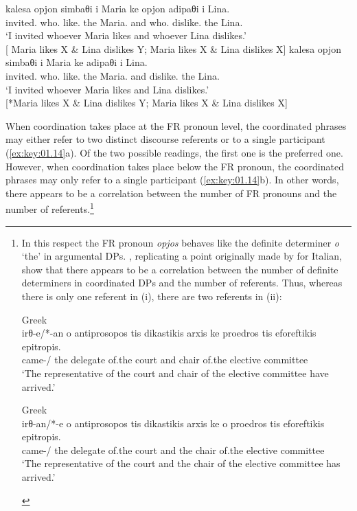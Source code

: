 \documentclass[output=paper]{langsci/langscibook}
\begin{document}
\ea {}\label{ex:key:01.14}
	\ea
		\gll kalesa opjon simbaθi i Maria ke opjon adipaθi i Lina.\\
			 invited.\Fsg{} who.\Acc{} like.\Tsg{} the Maria.\Nom{} and who.\Acc{} dislike.\Tsg{} the Lina.\Nom{}\\
		\glt \enquote*{I invited whoever Maria likes and whoever Lina dislikes.}\\
            {}[ Maria likes X \& Lina dislikes Y;  Maria likes X \& Lina dislikes X]
	\ex
		\gll kalesa opjon simbaθi i Maria ke adipaθi i Lina.\\
			 invited.\Fsg{} who.\Acc{} like.\Tsg{} the Maria.\Nom{} and dislike.\Tsg{} the Lina.\Nom{}\\
		\glt \enquote*{I invited whoever Maria likes and Lina dislikes.}\\
        {}[*Maria likes X \& Lina dislikes Y;  Maria likes X \& Lina dislikes X]
	\z
\z

When coordination takes place at the \gls{FR} pronoun level, the coordinated
phrases may either refer to two distinct discourse referents or to a single
participant (\ref{ex:key:01.14}a). Of the two possible readings, the first one
is the preferred one. However, when coordination takes place below the \gls{FR}
pronoun, the coordinated phrases may only refer to a single participant
(\ref{ex:key:01.14}b). In other words, there appears to be a correlation
between the number of \gls{FR} pronouns and the number of
referents.\footnote{In this respect the \gls{FR} pronoun \emph{opjos} behaves
    like the definite determiner \emph{o} ‘the’ in argumental DPs.
    \textcite[67--68]{AleHaeSta2007}, replicating a point originally made by
    \citet{Longobardi1994} for Italian, show that there appears to be a
    correlation between the number of definite determiners in coordinated DPs
    and the number of referents. Thus, whereas there is only one referent in
    (i), there are two referents in (ii):

\begin{exe}
     Greek\\
	\gll irθ-e/*-an o antiprosopos tis {dikastikis arxis} ke proedros tis eforeftikis epitropis.\\
        came-\Tsg/\Pl{} the delegate of.the court and chair of.the elective committee\\
	\glt \enquote*{The representative of the court and chair of the elective committee have arrived.}
\end{exe}

\begin{exe}
     Greek\\
    \gll irθ-an/*-e o antiprosopos tis {dikastikis arxis} ke o proedros tis eforeftikis epitropis.\\
        came-\Tpl/\Sg{} the delegate of.the court and the chair of.the elective committee\\
	\glt \enquote*{The representative of the court and the chair of the elective committee has arrived.}
\end{exe}
}
\end{document}

